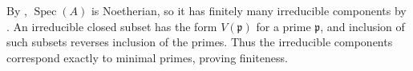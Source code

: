 By , $\operatorname{Spec}(A)$ is Noetherian, so it has finitely many irreducible components by . An irreducible closed subset has the form $V(\mathfrak p)$ for a prime $\mathfrak p$, and inclusion of such subsets reverses inclusion of the primes. Thus the irreducible components correspond exactly to minimal primes, proving finiteness.
